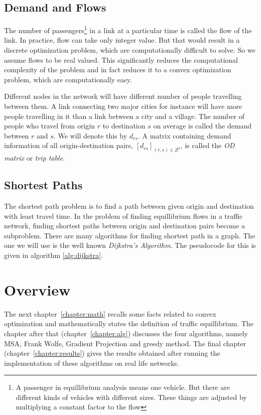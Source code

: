 	\subsection{Demand and Flows}
	The number of passengers\footnote{A passenger in equillibrium analysis
	means one vehicle. But there are different kinds of vehicles
	with different sizes. These things are adjusted by
	multiplying a constant factor to the flow}
	in a link at a particular time
	is called the flow of the link. In practice, flow can take
	only integer value. But that would result in a discrete optimization
	problem, which are computationally difficult to solve. So we assume flows
	to be real valued. This significantly reduces the computational
	complexity of the problem and in fact reduces it to a convex
	optimization problem, which are computationally easy.

	Different nodes in the network will have different number of
	people travelling between them. A link connecting two major
	cities for instance will have more people travelling in it
	than a link between a city and a village.
	The number of people who travel from origin $r$ to destination
	$s$ on average is called the demand between $r$ and $s$. We
	will denote this by $d_{rs}$. A matrix containing demand information
	of all origin-destination pairs, $[d_{rs}]_{(r,s)\in Z^2}$,
	is called the \emph{OD matrix} or \emph{trip table}.


	\subsection{Shortest Paths}
	The shortest path problem is to find a path between given origin
	and destination with least travel time.
	In the problem of finding equillibrium flows in a traffic network,
	finding shortest paths between origin and destination pairs
	become a subproblem.
	There are many algorithms for finding shortest path in a graph.
	The one we will use is the well known \emph{Dijkstra's Algorithm}.
	The pseudocode for this is given in algorithm \ref{alg:dijkstra}.
	
	

\section{Overview}
The next chapter~\ref{chapter:math} recalls some facts
related to convex optimization
and mathematically states the definition of traffic equillibrium.
The chapter after that (chapter~\ref{chapter:alg}) discusses the four
algorithms, namely MSA, Frank Wolfe, Gradient Projection and
greedy method. The final chapter (chapter~\ref{chapter:results})
gives the results obtained after running the implementation of
these algorithms on real life networks.

